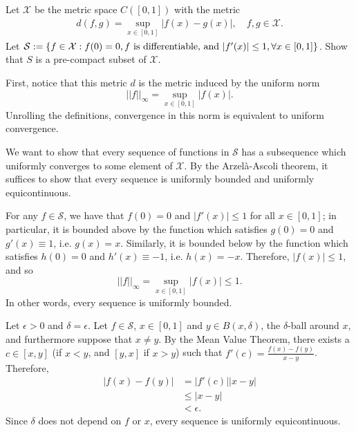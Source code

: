 \begin{problem}
Let $\mathcal{X}$ be the metric space $C([0,1])$ with the metric
\begin{align*}
    d(f,g) = \sup_{x\in [0,1]} |f(x)-g(x)|, \quad f, g \in \mathcal{X}.
\end{align*}
Let $\mathcal{S} := \left\{ f \in \mathcal{X} : f(0) = 0, f \text{ is differentiable, and  } |f'(x)| \le 1, \forall x \in [0,1]\right\}$. Show that $S$ is a pre-compact subset of $\mathcal{X}$.
\begin{solution}
First, notice that this metric $d$ is the metric induced by the uniform norm
$$ ||f||_\infty = \sup_{x \in [0,1]} |f(x)|. $$
Unrolling the definitions, convergence in this norm is equivalent to uniform convergence.

We want to show that every sequence of functions in $\mathcal{S}$ has a subsequence which uniformly converges to some element of $\mathcal{X}$. By the Arzelà-Ascoli theorem, it suffices to show that every sequence is uniformly bounded and uniformly equicontinuous.

For any $f \in \mathcal{S}$, we have that $f(0) = 0$ and $|f'(x)| \leq 1$ for all $x \in [0,1]$; in particular, it is bounded above by the function which satisfies $g(0) = 0$ and $g'(x) \equiv 1$, i.e. $g(x) = x$. Similarly, it is bounded below by the function which satisfies $h(0) = 0$ and $h'(x) \equiv -1$, i.e. $h(x) = -x$. Therefore, $|f(x)| \leq 1$, and so
$$ ||f||_\infty = \sup_{x \in [0,1]} |f(x)| \leq 1. $$
In other words, every sequence is uniformly bounded.

Let $\epsilon > 0$ and $\delta = \epsilon$. Let $f \in \mathcal{S}$, $x \in [0,1]$ and $y \in B(x,\delta)$, the $\delta$-ball around $x$, and furthermore suppose that $x \neq y$. By the Mean Value Theorem, there exists a $c \in [x,y]$ (if $x < y$, and $[y,x]$ if $x > y$) such that $f'(c) = \frac{f(x) - f(y)}{x - y}$. Therefore,
\begin{align*}
    |f(x) - f(y)| &= |f'(c)| |x - y| \\
    &\leq |x - y| \\
    &< \epsilon.
\end{align*}
Since $\delta$ does not depend on $f$ or $x$, every sequence is uniformly equicontinuous.
\end{solution}
\end{problem}

